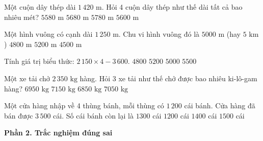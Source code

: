 \begin{ex} %
Một cuộn dây thép dài $1\,420\text{ m}$. Hỏi 4 cuộn dây thép như thế dài tất cả bao nhiêu mét?
\choice
{$5580\text{ m}$}
{\True $5680\text{ m}$}
{$5780\text{ m}$}
{$5600\text{ m}$}
\end{ex}

\begin{ex} %
Một hình vuông có cạnh dài $1\,250\text{ m}$. Chu vi hình vuông đó là
\choice
{\True $5000\text{ m}$ (hay $5\text{ km}$)}
{$4800\text{ m}$}
{$5200\text{ m}$}
{$4500\text{ m}$}
\end{ex}

\begin{ex} %
Tính giá trị biểu thức: $2\,150 \times 4 - 3\,600$.
\choice
{$4800$}
{$5200$}
{\True $5000$}
{$5500$}
\end{ex}

\begin{ex} %
Một xe tải chở $2\,350\text{ kg}$ hàng. Hỏi 3 xe tải như thế chở được bao nhiêu ki-lô-gam hàng?
\choice
{$6950\text{ kg}$}
{$7150\text{ kg}$}
{$6850\text{ kg}$}
{\True $7050\text{ kg}$}
\end{ex}

\begin{ex} %
Một cửa hàng nhập về 4 thùng bánh, mỗi thùng có $1\,200$ cái bánh. Cửa hàng đã bán được $3\,500$ cái. Số cái bánh còn lại là
\choice
{\True $1300$ cái}
{$1200$ cái}
{$1400$ cái}
{$1500$ cái}
\end{ex}

\textbf{Phần 2. Trắc nghiệm đúng sai}

